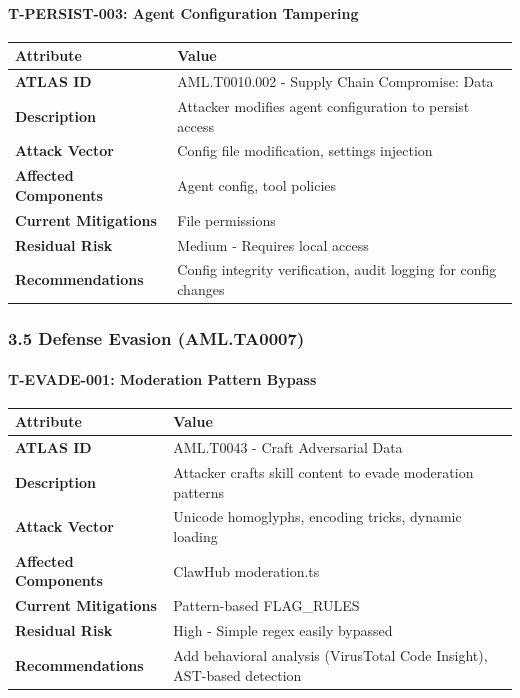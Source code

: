 \paragraph{T-PERSIST-003: Agent Configuration Tampering}



\begin{table}[h]
\centering
\small
\begin{tabular}{|l|l|}
\hline
Attribute & Value \\
\hline
\textbf{ATLAS ID} & AML.T0010.002 - Supply Chain Compromise: Data \\
\hline
\textbf{Description} & Attacker modifies agent configuration to persist access \\
\hline
\textbf{Attack Vector} & Config file modification, settings injection \\
\hline
\textbf{Affected Components} & Agent config, tool policies \\
\hline
\textbf{Current Mitigations} & File permissions \\
\hline
\textbf{Residual Risk} & Medium - Requires local access \\
\hline
\textbf{Recommendations} & Config integrity verification, audit logging for config changes \\
\hline
\end{tabular}
\end{table}



\hrulefill


\subsubsection{3.5 Defense Evasion (AML.TA0007)}


\paragraph{T-EVADE-001: Moderation Pattern Bypass}



\begin{table}[h]
\centering
\small
\begin{tabular}{|l|l|}
\hline
Attribute & Value \\
\hline
\textbf{ATLAS ID} & AML.T0043 - Craft Adversarial Data \\
\hline
\textbf{Description} & Attacker crafts skill content to evade moderation patterns \\
\hline
\textbf{Attack Vector} & Unicode homoglyphs, encoding tricks, dynamic loading \\
\hline
\textbf{Affected Components} & ClawHub moderation.ts \\
\hline
\textbf{Current Mitigations} & Pattern-based FLAG\_RULES \\
\hline
\textbf{Residual Risk} & High - Simple regex easily bypassed \\
\hline
\textbf{Recommendations} & Add behavioral analysis (VirusTotal Code Insight), AST-based detection \\
\hline
\end{tabular}
\end{table}



